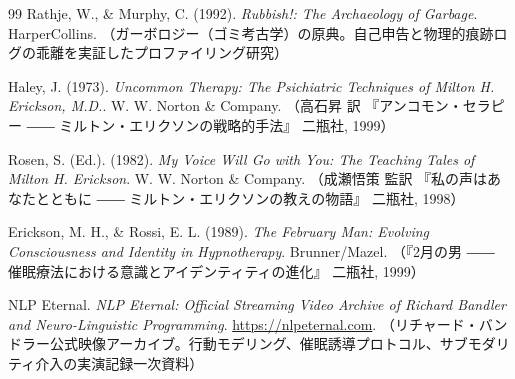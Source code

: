 \begin{thebibliography}{99}
Rathje, W., \& Murphy, C. (1992). \textit{Rubbish!: The Archaeology of Garbage}. HarperCollins. （ガーボロジー（ゴミ考古学）の原典。自己申告と物理的痕跡ログの乖離を実証したプロファイリング研究）

Haley, J. (1973). \textit{Uncommon Therapy: The Psichiatric Techniques of Milton H. Erickson, M.D.}. W. W. Norton \& Company. （高石昇 訳 『アンコモン・セラピー ―― ミルトン・エリクソンの戦略的手法』 二瓶社, 1999）

Rosen, S. (Ed.). (1982). \textit{My Voice Will Go with You: The Teaching Tales of Milton H. Erickson}. W. W. Norton \& Company. （成瀬悟策 監訳 『私の声はあなたとともに ―― ミルトン・エリクソンの教えの物語』 二瓶社, 1998）

Erickson, M. H., \& Rossi, E. L. (1989). \textit{The February Man: Evolving Consciousness and Identity in Hypnotherapy}. Brunner/Mazel. （『2月の男 ―― 催眠療法における意識とアイデンティティの進化』 二瓶社, 1999）

NLP Eternal. \textit{NLP Eternal: Official Streaming Video Archive of Richard Bandler and Neuro-Linguistic Programming}. \url{https://nlpeternal.com}. （リチャード・バンドラー公式映像アーカイブ。行動モデリング、催眠誘導プロトコル、サブモダリティ介入の実演記録一次資料）

\end{thebibliography}


